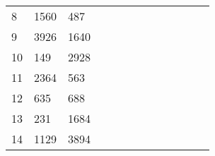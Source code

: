 \begin{table}[tb]
\begin{tabular}{|l|l|l|llllllllll}
		8  & 1560 & 487  &                           &                           &                           &                           &                           &                           &                           &                           &                           &                           \\ \cline{1-3}
		9  & 3926 & 1640 &                           &                           &                           &                           &                           &                           &                           &                           &                           &                           \\ \cline{1-3}
		10 & 149  & 2928 &                           &                           &                           &                           &                           &                           &                           &                           &                           &                           \\ \cline{1-3}
		11 & 2364 & 563  &                           &                           &                           &                           &                           &                           &                           &                           &                           &                           \\ \cline{1-3}
		12 & 635  & 688  &                           &                           &                           &                           &                           &                           &                           &                           &                           &                           \\ \cline{1-3}
		13 & 231  & 1684 &                           &                           &                           &                           &                           &                           &                           &                           &                           &                           \\ \cline{1-3}
		14 & 1129 & 3894 &                           &                           &                           &                           &                           &                           &                           &                           &                           &                           \\ \cline{1-3}
	\end{tabular}
	
	
\end{table}

